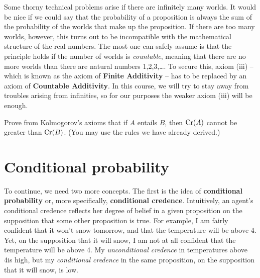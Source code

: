 Some thorny technical problems arise if there are infinitely many worlds. It
would be nice if we could say that the probability of a proposition is always
the sum of the probability of the worlds that make up the proposition. If there
are too many worlds, however, this turns out to be incompatible with the
mathematical structure of the real numbers. The most one can safely assume is
that the principle holds if the number of worlds is \emph{countable}, meaning
that there are no more worlds than there are natural numbers 1,2,3,\ldots. To
secure this, axiom (iii) -- which is known as the axiom of \textbf{Finite
  Additivity} -- has to be replaced by an axiom of \textbf{Countable
  Additivity}.
%
%
In this course, we will try to stay away from troubles arising from
infinities, so for our purposes the weaker axiom (iii) will be enough.

\begin{exercise}{3}
  Prove from Kolmogorov's axioms that if $A$ entails $B$, then
  $\text{Cr}(A)$ cannot be greater than $\text{Cr}(B)$. (You may use the rules we
  have already derived.)%
\end{exercise}


\section{Conditional probability}\label{sec:conditional}

To continue, we need two more concepts. The first is the idea of
\textbf{conditional probability} or, more specifically, \textbf{conditional
  credence}. Intuitively, an agent's conditional credence reflects her degree of
belief in a given proposition on the supposition that some other proposition is
true. For example, I am fairly confident that it won't snow tomorrow, and that
the temperature will be above 4\celsius. Yet, on the supposition that it will
snow, I am not at all confident that the temperature will be above 4\celsius. 
My \emph{unconditional credence} in temperatures above 4\celsius is high, but
my \emph{conditional credence} in the same proposition, on the supposition that
it will snow, is low.

